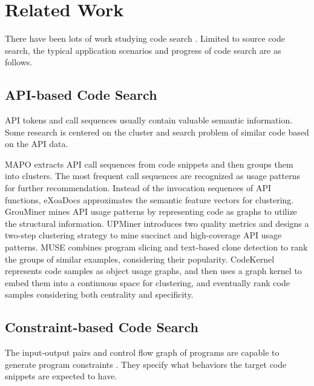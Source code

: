 \documentclass[conference]{IEEEtran}
\begin{document}
 \section{Related Work}
\label{sec:related}

There have been lots of work studying code search \cite{Sadowski2015HowDS,Liu2020OpportunitiesAC}. Limited to source code search, the typical application scenarios and progress of code search are as follows.

\subsection{API-based Code Search}

API tokens and call sequences usually contain valuable semantic information. Some research is centered on the cluster and search problem of similar code based on the API data.

MAPO \cite{Zhong2009MAPOMA} extracts API call sequences from code snippets and then groups them into clusters. The most frequent call sequences are recognized as usage patterns for further recommendation. Instead of the invocation sequences of API functions, eXoaDocs \cite{Kim2010TowardsAI} approximates the semantic feature vectors for clustering. GrouMiner \cite{Nguyen2009GraphbasedMO} mines API usage patterns by representing code as graphs to utilize the structural information. UPMiner \cite{Wang2013MiningSA} introduces two quality metrics and designs a two-step clustering strategy to mine succinct and high-coverage API usage patterns. MUSE \cite{Moreno2015HowCI} combines program slicing and text-based clone detection to rank the groups of similar examples, considering their popularity. CodeKernel \cite{Gu2019CodeKernelAG} represents code samples as object usage graphs, and then uses a graph kernel to embed them into a continuous space for clustering, and eventually rank code samples considering both centrality and specificity.

\subsection{Constraint-based Code Search}

The input-output pairs and control flow graph of programs are capable to generate program constraints \cite{Stolee2014SolvingTS}. They specify what behaviors the target code snippets are expected to have.
\end{document}
